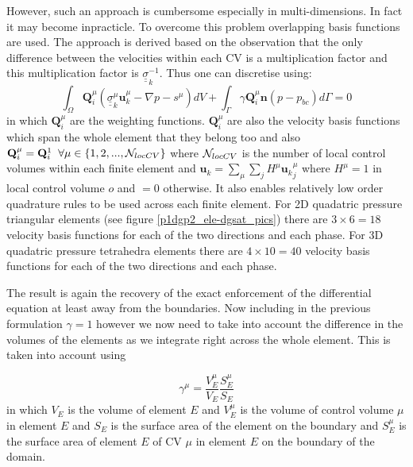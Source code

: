 However, such an approach is cumbersome especially in multi-dimensions. 
In fact it may become inpracticle. To overcome this 
problem overlapping basis functions are used. The approach is derived 
based on the observation 
that the only difference between the velocities 
within each CV is a multiplication factor 
and this multiplication factor is ${\underline {\underline \sigma}}_k^{-1}$. 
Thus one can discretise  
using: 
\begin{equation}
\int_\Omega {\mathbf Q}_i^\mu ({\underline{\underline\sigma}}_k^\mu {\mathbf u}_k^\mu - \nabla p -s^\mu) dV + 
\int_{\Gamma}\gamma {\mathbf Q}_i^\mu {\mathbf n} (p-p_{bc}) d\Gamma =0 
\label{overlap-eqn} 
\end{equation}
in which ${\mathbf Q}_i^\mu$ are the weighting functions. 
${\mathbf Q}_i^\mu$ are also the  
velocity basis functions which span the whole 
element that they belong too and also ${\mathbf Q}_i^\mu={\mathbf Q}_i^1\;\; \forall \mu\in\{1,2,...,{\cal N}_{locCV}\}$
where ${\cal N}_{locCV}$ is the number of local control volumes within each 
finite element and ${\mathbf u}_k =\sum_\mu \sum_j H^\mu {{\mathbf u}_k}_j^\mu$ where 
$H^\mu=1$ in local control volume $o$ and $=0$ otherwise. 
It also enables relatively low order quadrature rules to be used 
across each finite element.  
For 2D quadatric pressure triangular elements (see figure \ref{p1dgp2_ele-dgsat_pics}) 
there are $3\times6=18$ velocity basis 
functions for each of the two directions and each phase. 
For 3D quadatric pressure 
tetrahedra elements there are $4\times 10=40$ velocity basis 
functions for each of the two directions and each phase.

The result is again the recovery of the exact enforcement of 
the differential equation at least away from the boundaries. 
Now including in the previous formulation $\gamma=1$ however 
we now need to take into account the difference in the 
volumes of the elements as we integrate right 
across the whole element. This is taken into account 
using 

\begin{equation}
\gamma^\mu = \frac{V^\mu_E}{V_E} \frac{S^\mu_E}{S_E}
\label{overlap-eqn-gamma}
\end{equation}
in which $V_E$ is the volume of element $E$ 
and $V^\mu_E$ is the volume of control volume $\mu$ 
in element $E$ and $S_E$ is the surface area of the element 
on the boundary and $S^\mu_E$ is the surface 
area of element $E$ of CV $\mu$ in element $E$ on the boundary 
of the domain. 

